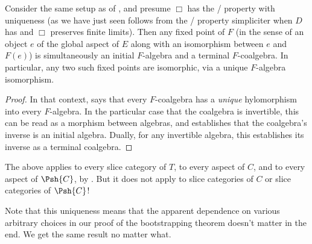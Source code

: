 \begin{corollary}\label{InitialTerminalCoincidence}
Consider the same setup as of , and presume $\Box$ has the \Loeb/ property with uniqueness (as we have just seen follows from the \Loeb/ property simpliciter when $D$ has and $\Box$ preserves finite limits). Then any fixed point of $F$ (in the sense of an object $e$ of the global aspect of $E$ along with an isomorphism between $e$ and $F(e)$) is simultaneously an initial $F$-algebra and a terminal $F$-coalgebra. In particular, any two such fixed points are isomorphic, via a unique $F$-algebra isomorphism.
\end{corollary}
\begin{proof}
In that context,  says that every $F$-coalgebra has a \emph{unique} hylomorphism into every $F$-algebra. In the particular case that the coalgebra is invertible, this can be read as a morphism between algebras, and establishes that the coalgebra's inverse is an initial algebra. Dually, for any invertible algebra, this establishes its inverse as a terminal coalgebra.
\end{proof}

\begin{TODOblock}


The above applies to every slice category of $T$, to every aspect of $C$, and to every aspect of $\Psh{C}$, by . But it does not apply to slice categories of $C$ or slice categories of $\Psh{C}$!
\end{TODOblock}

\begin{observation}
Note that this uniqueness means that the apparent dependence on various arbitrary choices in our proof of the bootstrapping theorem doesn't matter in the end. We get the same result no matter what.
\end{observation}


